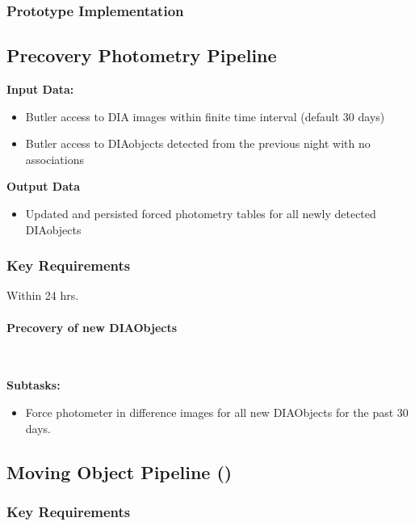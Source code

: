 \subsubsection{Prototype Implementation}

\clearpage

\subsection{Precovery Photometry Pipeline}

\noindent
{\bf Input Data:}\\
\begin{itemize}
\item Butler access to DIA images within finite time interval (default 
  30 days) 
\item Butler access to DIAobjects detected from the previous night 
  with no associations 
\end{itemize}
{\bf Output Data}\\
\begin{itemize}
\item Updated and persisted forced photometry tables for all newly
  detected DIAobjects
\end{itemize}

\subsubsection{Key Requirements}

Within 24 hrs.

\paragraph{Precovery of new DIAObjects}~

\noindent
{\bf Subtasks:}
\begin{itemize}
\item Force photometer in difference images for all new DIAObjects for the past 30 days.
\end{itemize}
\clearpage

\subsection{Moving Object Pipeline (\wbsMOPS)}

\subsubsection{Key Requirements}

